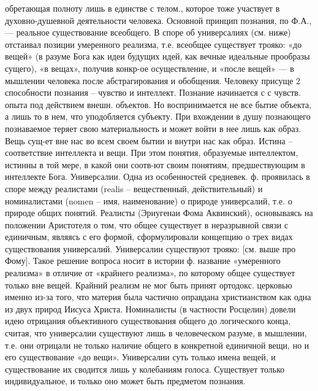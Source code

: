 \documentclass[12pt]{article}
\begin{document}
обретающая полноту лишь в единстве с телом., которое  тоже участвует в духовно-душевной деятельности
человека.
Основной принцип познания, по Ф.А., — реальное существование всеобщего. В споре об универсалиях (см.
ниже) отстаивал позиции умеренного реализма, т.е. всеобщее существует трояко: «до вещей» (в разуме Бога как
идеи будущих идей, как вечные идеальные прообразы сущего), «в вещах», получив конкр-ое осуществление, и
«после вещей» — в мышлении человека после абстрагирования и обобщения. Человеку присуще 2 способности
познания – чувство и интеллект. Познание начинается с с чувств. опыта под действием внешн. объектов. Но
воспринимается не все бытие объекта, а лишь то в нем, что уподобляется субъекту. При вхождении в душу
познающего познаваемое теряет свою материальность и может войти в нее лишь как образ. Вещь сущ-ет вне
нас во всем своем бытии и внутри нас как образ.
Истина – соответствие интеллекта и вещи. При этом понятия, образуемые интеллектом, истинны в той мере, в
какой они соотв-ют своим понятиям, предшествующим в интеллекте Бога.
Универсалии.  Одна  из  особенностей  средневек.  ф.  проявилась  в  споре  между  реалистами  (realis  –
вещественный, действительный) и номиналистами (nomen – имя, наименование) о природе универсалий, т.е. о
природе общих понятий. Реалисты (Эриугенаи Фома Аквинский), основываясь на положении Аристотеля о том,
что общее существует в неразрывной связи с единичным, являясь с его формой, сформулировали концепцию о
трех видах существования универсалий. Универсалии существуют трояко: [см. выше про Фому]. Такое решение 
вопроса носит в истории ф. название «умеренного реализма» в отличие от «крайнего реализма», по которому
общее существует только вне вещей. Крайний реализм не мог быть принят ортодокс. церковью именно из-за
того, что материя была частично оправдана христианством как одна из двух природ Иисуса Христа.
Номиналисты  (в  частности  Росцелин)  довели  идею  отрицания  объективного  существования  общего  до
логического конца, считая, что универсалии существуют лишь в человеческом разуме, в мышлении, т.е. они
отрицали  не  только  наличие  общего  в  конкретной  единичной  вещи,  но  и  его  существование  «до  вещи».
Универсалии суть только имена вещей, и существование их сводится лишь у колебаниям голоса. Существует
только индивидуальное, и только оно может быть предметом познания.

\newpage
\end{document}
